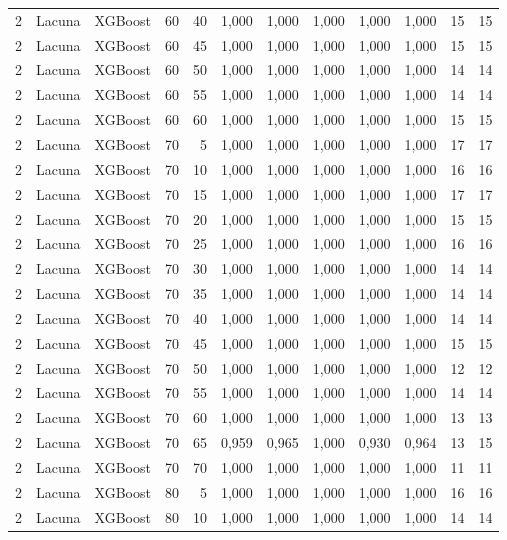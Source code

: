 \begin{longtable}{ccclrrrrrrrr}
2 & Lacuna & XGBoost & 60 & 40 & 1,000 & 1,000 & 1,000 & 1,000 & 1,000 & 15 & 15 \\
2 & Lacuna & XGBoost & 60 & 45 & 1,000 & 1,000 & 1,000 & 1,000 & 1,000 & 15 & 15 \\
2 & Lacuna & XGBoost & 60 & 50 & 1,000 & 1,000 & 1,000 & 1,000 & 1,000 & 14 & 14 \\
2 & Lacuna & XGBoost & 60 & 55 & 1,000 & 1,000 & 1,000 & 1,000 & 1,000 & 14 & 14 \\
2 & Lacuna & XGBoost & 60 & 60 & 1,000 & 1,000 & 1,000 & 1,000 & 1,000 & 15 & 15 \\
2 & Lacuna & XGBoost & 70 & 5 & 1,000 & 1,000 & 1,000 & 1,000 & 1,000 & 17 & 17 \\
2 & Lacuna & XGBoost & 70 & 10 & 1,000 & 1,000 & 1,000 & 1,000 & 1,000 & 16 & 16 \\
2 & Lacuna & XGBoost & 70 & 15 & 1,000 & 1,000 & 1,000 & 1,000 & 1,000 & 17 & 17 \\
2 & Lacuna & XGBoost & 70 & 20 & 1,000 & 1,000 & 1,000 & 1,000 & 1,000 & 15 & 15 \\
2 & Lacuna & XGBoost & 70 & 25 & 1,000 & 1,000 & 1,000 & 1,000 & 1,000 & 16 & 16 \\
2 & Lacuna & XGBoost & 70 & 30 & 1,000 & 1,000 & 1,000 & 1,000 & 1,000 & 14 & 14 \\
2 & Lacuna & XGBoost & 70 & 35 & 1,000 & 1,000 & 1,000 & 1,000 & 1,000 & 14 & 14 \\
2 & Lacuna & XGBoost & 70 & 40 & 1,000 & 1,000 & 1,000 & 1,000 & 1,000 & 14 & 14 \\
2 & Lacuna & XGBoost & 70 & 45 & 1,000 & 1,000 & 1,000 & 1,000 & 1,000 & 15 & 15 \\
2 & Lacuna & XGBoost & 70 & 50 & 1,000 & 1,000 & 1,000 & 1,000 & 1,000 & 12 & 12 \\
2 & Lacuna & XGBoost & 70 & 55 & 1,000 & 1,000 & 1,000 & 1,000 & 1,000 & 14 & 14 \\
2 & Lacuna & XGBoost & 70 & 60 & 1,000 & 1,000 & 1,000 & 1,000 & 1,000 & 13 & 13 \\
2 & Lacuna & XGBoost & 70 & 65 & 0,959 & 0,965 & 1,000 & 0,930 & 0,964 & 13 & 15 \\
2 & Lacuna & XGBoost & 70 & 70 & 1,000 & 1,000 & 1,000 & 1,000 & 1,000 & 11 & 11 \\
2 & Lacuna & XGBoost & 80 & 5 & 1,000 & 1,000 & 1,000 & 1,000 & 1,000 & 16 & 16 \\
2 & Lacuna & XGBoost & 80 & 10 & 1,000 & 1,000 & 1,000 & 1,000 & 1,000 & 14 & 14 \\

\end{longtable}
